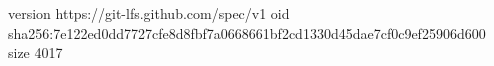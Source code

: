 version https://git-lfs.github.com/spec/v1
oid sha256:7e122ed0dd7727cfe8d8fbf7a0668661bf2cd1330d45dae7cf0c9ef25906d600
size 4017
